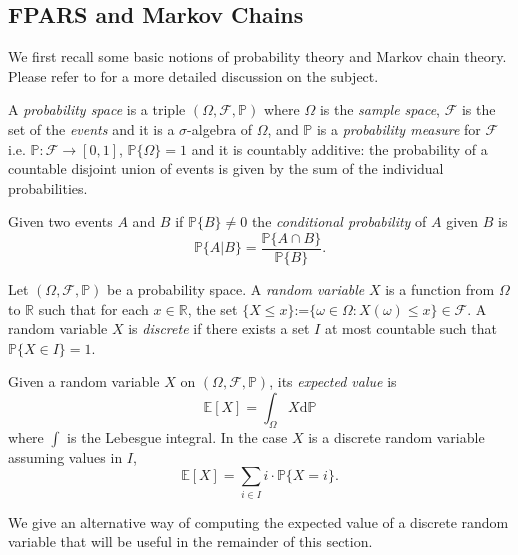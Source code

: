 \begin{LONG}
	\subsection{FPARS and Markov Chains}
	We first recall some basic notions of probability theory and Markov chain theory. Please refer to \cite{ash_probability_1999,norris_markov_1998} for a more detailed discussion on the subject.
	\begin{definition}
		A \emph{probability space} is a triple $(\Omega, \mathcal{F},\mathbb{P})$ where $\Omega$ is the \emph{sample space}, $\mathcal{F}$ is the set of the \emph{events} and it is a $\sigma$-algebra of $\Omega$, and $\mathbb{P}$ is a \emph{probability measure} for $\mathcal{F}$ i.e. $\mathbb{P} :\mathcal{F}\rightarrow[0,1]$, $\mathbb{P}\{\Omega\}=1$ and it is countably additive: the probability of a countable disjoint union of events is given by the sum of the individual probabilities.
	\end{definition}
	\begin{definition}
		Given two events $A$ and $B$ if $\mathbb{P}\{B\}\neq 0$ the \emph{conditional probability} of $A$ given $B$ is
		$$
		\mathbb{P}\{A|B\}=\frac{\mathbb{P}\{A\cap B\}}{\mathbb{P}\{B\}}.
		$$
	\end{definition}
	\begin{definition}
		Let $(\Omega, \mathcal{F},\mathbb{P})$ be a probability space. A \emph{random variable} $X$ is a function from $\Omega$ to $\mathbb{R}$ such that for each $x\in \mathbb{R}$, the set $\{X\leq x\}$:=$\{\omega\in\Omega : X(\omega)\leq x\}\in \mathcal{F}$. A random variable $X$ is \emph{discrete} if there exists a set $I$ at most countable such that $\mathbb{P}\{X\in I\}=1$.
	\end{definition} 
	\begin{definition}
		Given a random variable $X$ on $(\Omega, \mathcal{F},\mathbb{P})$, its \emph{expected value} is
		$$
		\mathbb{E}[X]=\int_{\Omega}X\mathrm{d}\mathbb{P}
		$$
		where $\int$ is the Lebesgue integral. In the case $X$ is a discrete random variable assuming values in $I$,
		$$
		\mathbb{E}[X]=\sum_{i\in I}i\cdot\mathbb{P}\{X=i\}.
		$$
	\end{definition}
	We give an alternative way of computing the expected value of a discrete random variable that will be useful in the remainder of this section.
	\begin{proposition}\label{prop:alt-def}

\end{proposition}
\end{LONG}
